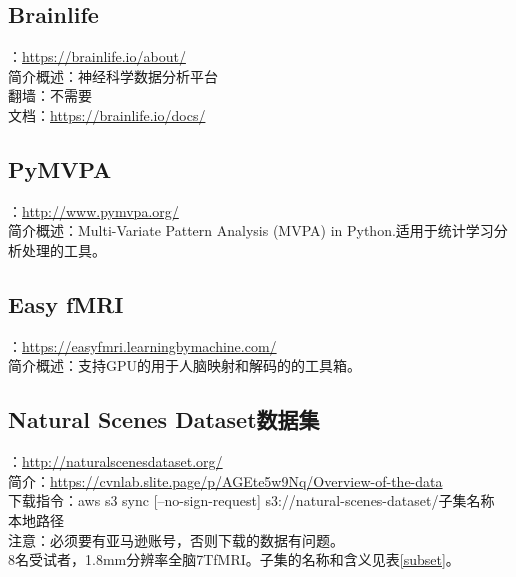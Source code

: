 \documentclass[12pt, a4paper, oneside]{ctexart}
\begin{document}
    \subsection{Brainlife}
    ：\url{https://brainlife.io/about/}\\
    简介概述：神经科学数据分析平台\\
    翻墙：不需要\\
    文档：\url{https://brainlife.io/docs/}

    \subsection{PyMVPA}
    ：\url{http://www.pymvpa.org/}\\
    简介概述：Multi-Variate Pattern Analysis (MVPA) in Python.适用于统计学习分析处理的工具。

    \subsection{Easy fMRI}
    ：\url{https://easyfmri.learningbymachine.com/}\\
    简介概述：支持GPU的用于人脑映射和解码的的工具箱。

    \subsection{Natural Scenes Dataset数据集\cite{Allen2022}}
    ：\url{http://naturalscenesdataset.org/}\\
    简介：\url{https://cvnlab.slite.page/p/AGEte5w9Nq/Overview-of-the-data}\\
    下载指令：aws s3 sync [--no-sign-request] s3://natural-scenes-dataset/子集名称 本地路径\\
    注意：必须要有亚马逊账号，否则下载的数据有问题。\\
    8名受试者，1.8mm分辨率全脑7TfMRI。子集的名称和含义见表\ref{subset}。
\end{document}
